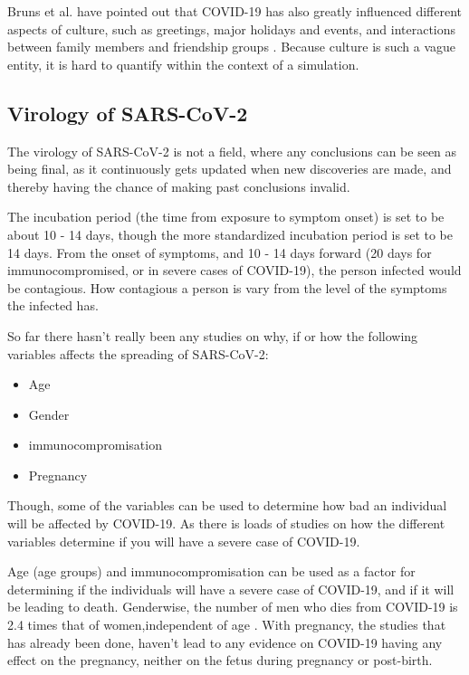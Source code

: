 Bruns et al. have pointed out that COVID-19 has also greatly influenced different aspects of culture, such as greetings, major holidays and events, and interactions between family members and friendship groups \citep{bruns_covid-19_2020}. Because culture is such a vague entity, it is hard to quantify within the context of a simulation.



\subsection{Virology of SARS-CoV-2}

The virology of SARS-CoV-2 is not a field, where any conclusions can be seen as being final, as it continuously gets updated when new discoveries are made, and thereby having the chance of making past conclusions invalid.

The incubation period (the time from exposure to symptom onset) is set to be about 10 - 14 days, though the more standardized incubation period is set to be 14 days. From the onset of symptoms, and 10 - 14 days forward (20 days for immunocompromised, or in severe cases of COVID-19), the person infected would be contagious. How contagious a person is vary from the level of the symptoms the infected has. \citep{ries_how_2020}

So far there hasn't really been any studies on why, if or how the following variables affects the spreading of SARS-CoV-2:
\begin{itemize}
  \item Age
  \item Gender
  \item immunocompromisation
  \item Pregnancy
\end{itemize}

Though, some of the variables can be used to determine how bad an individual will be affected by COVID-19. As there is loads of studies on how the different variables determine if you will have a severe case of COVID-19.

Age (age groups) and immunocompromisation can be used as a factor for determining if the individuals will have a severe case of COVID-19, and if it will be leading to death. Genderwise, the number of men who dies from COVID-19 is 2.4 times that of women,independent of age \citep{jin_gender_2020}. With pregnancy, the studies that has already been done, haven't lead to any evidence on COVID-19 having any effect on the pregnancy, neither on the fetus during pregnancy or post-birth.



